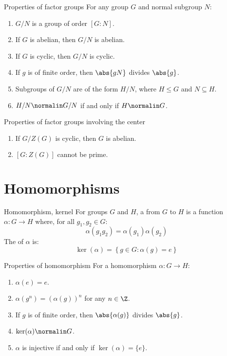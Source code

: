 \begin{thmbox}{Properties of factor groups}{}
    For any group $G$ and normal subgroup $N$:
    \begin{enumerate}
        \item $G/N$ is a group of order $[G:N]$.
        \item If $G$ is abelian, then $G/N$ is abelian.
        \item If $G$ is cyclic, then $G/N$ is cyclic.
        \item If $g$ is of finite order, then $\abs{gN}$ divides $\abs{g}$.
        \item Subgroups of $G/N$ are of the form $H/N$, where $H \leq G$ and $N \subseteq H$.
        \item $H/N \normalin G/N$ if and only if $H \normalin G$.
    \end{enumerate}
\end{thmbox}

\begin{thmbox}{Properties of factor groups involving the center}{}
    \begin{enumerate}
        \item If $G/Z(G)$ is cyclic, then $G$ is abelian.
        \item $[G:Z(G)]$ cannot be prime.
    \end{enumerate}
\end{thmbox}

\section{Homomorphisms}

\begin{dfnbox}{Homomorphism, kernel}{}
    For groups $G$ and $H$, a  from $G$ to $H$ is a function $\alpha : G \to H$ where, for all $g_1, g_2 \in G$:
    \[ \alpha(g_1g_2) = \alpha(g_1) \alpha(g_2) \]
    The  of $\alpha$ is:
    \[ \ker(\alpha) = \left\{ g \in G : \alpha(g) = e \right\} \]
\end{dfnbox}

\begin{thmbox}{Properties of homomorphism}{}
    For a homomorphism $\alpha : G \to H$:
    \begin{enumerate}
        \item $\alpha(e) = e$.
        \item $\alpha(g^n) = (\alpha(g))^n$ for any $n \in \Z$.
        \item If $g$ is of finite order, then $\abs{\alpha(g)}$ divides $\abs{g}$.
        \item $\ker(\alpha) \normalin G$.
        \item $\alpha$ is injective if and only if $\ker(\alpha) = \{e\}$.
    \end{enumerate}
\end{thmbox}

